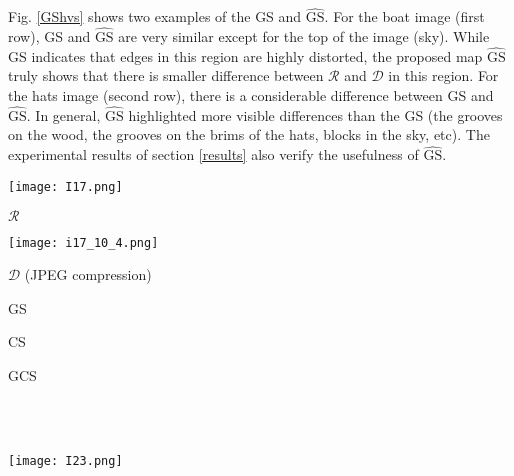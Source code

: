 Fig. \ref{GShvs} shows two examples of the GS and $\widehat{\text{GS}}$. For the boat image (first row), GS and $\widehat{\text{GS}}$ are very similar except for the top of the image (sky). While GS indicates that edges in this region are highly distorted, the proposed map $\widehat{\text{GS}}$ truly shows that there is smaller difference between $\mathcal{R}$ and $\mathcal{D}$ in this region. For the hats image (second row), there is a considerable difference between GS and $\widehat{\text{GS}}$. In general, $\widehat{\text{GS}}$ highlighted more visible differences than the GS (the grooves on the wood, the grooves on the brims of the hats, blocks in the sky, etc). The experimental results of section \ref{results} also verify the usefulness of $\widehat{\text{GS}}$.              


\begin{figure*}[htb]
\scriptsize
\begin{minipage}[b]{0.197\linewidth}
  \centering
  \centerline{\texttt{[image: I17.png]}} 
  \vspace{0.10cm}
\centerline{$\mathcal{R}$}
\end{minipage}
\begin{minipage}[b]{0.19\linewidth}
  \centering
  \centerline{\texttt{[image: i17\_10\_4.png]}}
  \vspace{0.10cm}
\centerline{$\mathcal{D}$ (JPEG compression)}
\end{minipage}
\begin{minipage}[b]{0.19\linewidth}
  \centering
  \centerline{}
\vspace{0.10cm}
\centerline{GS}
\end{minipage}
\begin{minipage}[b]{0.19\linewidth}
  \centering
  \centerline{}
\vspace{0.10cm}
\centerline{CS}
\end{minipage}
\begin{minipage}[b]{.19\linewidth}
  \centering
  \centerline{}
\vspace{0.10cm}
\centerline{GCS}
\end{minipage}
\\ \\
\begin{minipage}[b]{0.19\linewidth}
  \centering
  \centerline{\texttt{[image: I23.png]}} 
  \vspace{0.10cm}

\end{minipage}
\end{figure*}
